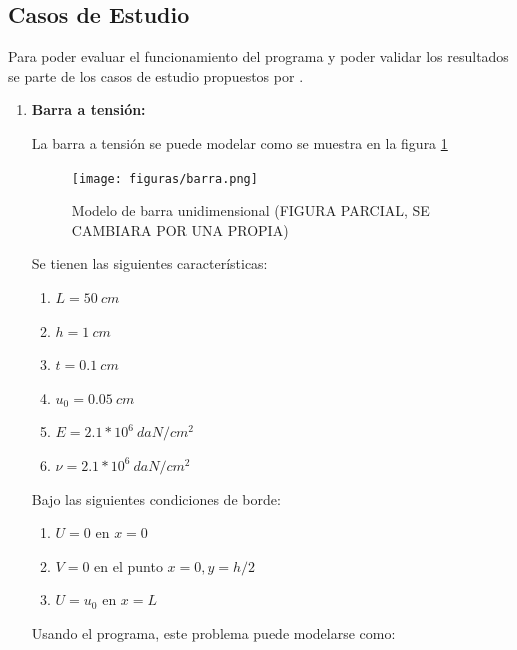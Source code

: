 	\subsection{Casos de Estudio}
	\label{sub:casosestudio}
	Para poder evaluar el funcionamiento del programa y poder validar los resultados se parte de los casos de estudio propuestos por \cite{Pisano2009}.

	\begin{enumerate}
		\item \textbf{Barra a tensión:}

		La barra a tensión se puede modelar como se muestra en la figura \ref{fig:barra_tension}

		\begin{figure}
			\centering
			\sffamily
			\texttt{[image: figuras/barra.png]}
			\caption{Modelo de barra unidimensional (FIGURA PARCIAL, SE CAMBIARA POR UNA PROPIA)}
			\label{fig:barra_tension}
		\end{figure}

		Se tienen las siguientes características:
		\begin{enumerate}
			\item[] $L = 50\ cm$
			\item[] $h = 1\ cm$
			\item[] $t = 0.1\ cm$
			\item[] $u_0 = 0.05\ cm$
			\item[] $E = 2.1*10^6\ daN/cm^2$
			\item[] $\nu = 2.1*10^6\ daN/cm^2$
		\end{enumerate}

		Bajo las siguientes condiciones de borde:
		\begin{enumerate}
			\item[] $U = 0$ en $x=0$
			\item[] $V = 0$ en el punto $x=0,y=h/2$
			\item[] $U = u_0$ en $x=L$
		\end{enumerate}

		Usando el programa, este problema puede modelarse como:


\end{enumerate}
